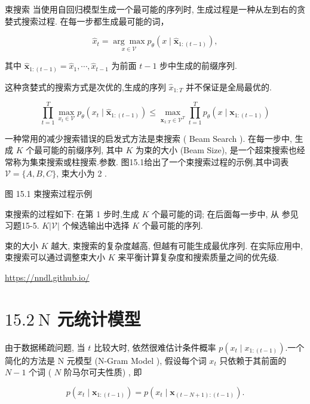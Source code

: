 \documentclass[10pt]{article}
\begin{document}
束搜索 当使用自回归模型生成一个最可能的序列时, 生成过程是一种从左到右的贪婪式搜索过程. 在每一步都生成最可能的词，


\begin{equation*}
\hat{x}_{t}=\underset{x \in \mathcal{V}}{\arg \max } p_{\theta}\left(x \mid \hat{\boldsymbol{x}}_{1:(t-1)}\right), \tag{15.7}
\end{equation*}


其中 $\hat{\boldsymbol{x}}_{1:(t-1)}=\hat{x}_{1}, \cdots, \hat{x}_{t-1}$ 为前面 $t-1$ 步中生成的前缀序列.

这种贪婪式的搜索方式是次优的,生成的序列 $\hat{x}_{1: T}$ 并不保证是全局最优的.


\begin{equation*}
\prod_{t=1}^{T} \max _{x_{t} \in \mathcal{V}} p_{\theta}\left(x_{t} \mid \hat{\boldsymbol{x}}_{1:(t-1)}\right) \leq \max _{\boldsymbol{x}_{1: T} \in \mathcal{V}^{T}} \prod_{t=1}^{T} p_{\theta}\left(x \mid \boldsymbol{x}_{1:(t-1)}\right) \tag{15.8}
\end{equation*}


一种常用的减少搜索错误的启发式方法是束搜索 ( Beam Search ). 在每一步中, 生成 $K$ 个最可能的前缀序列, 其中 $K$ 为束的大小 (Beam Size), 是一个超束搜索也经常称为集束搜索或柱搜索.参数. 图15.1给出了一个束搜索过程的示例,其中词表 $\mathcal{V}=\{A, B, C\}$, 束大小为 2 .



图 15.1 束搜索过程示例

束搜索的过程如下: 在第 1 步时,生成 $K$ 个最可能的词; 在后面每一步中, 从 参见习题15-5. $K|\mathcal{V}|$ 个候选输出中选择 $K$ 个最可能的序列.

束的大小 $K$ 越大, 束搜索的复杂度越高, 但越有可能生成最优序列. 在实际应用中, 束搜索可以通过调整束大小 $K$ 来平衡计算复杂度和搜索质量之间的优先级.

\href{https://nndl.github.io/}{https://nndl.github.io/}

\section*{$15.2 \mathrm{~N}$ 元统计模型}
由于数据稀疏问题, 当 $t$ 比较大时, 依然很难估计条件概率 $p\left(x_{t} \mid x_{1:(t-1)}\right)$.一个简化的方法是 $\mathrm{N}$ 元模型 (N-Gram Model ), 假设每个词 $x_{t}$ 只依赖于其前面的 $N-1$ 个词 ( $N$ 阶马尔可夫性质) , 即


\begin{equation*}
p\left(x_{t} \mid \boldsymbol{x}_{1:(t-1)}\right)=p\left(x_{t} \mid \boldsymbol{x}_{(t-N+1):(t-1)}\right) . \tag{15.9}
\end{equation*}
\end{document}

